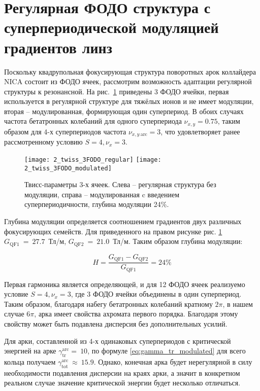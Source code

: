 	\section{Регулярная ФОДО структура с суперпериодической модуляцией градиентов линз}\label{sec:transition_variation/methods/FODO}

\par Поскольку квадрупольная фокусирующая структура поворотных арок коллайдера NICA состоит из ФОДО ячеек, рассмотрим возможность адаптации регулярной структуры к резонансной. На рис.~\ref{fig:twiss_3FODO} приведены 3 ФОДО ячейки, первая используется в регулярной структуре для тяжёлых ионов и не имеет модуляции, вторая – модулированная, формирующая один суперпериод. В обоих случаях частота бетатронных колебаний для одного суперпериода $\nu_{x,y}=0.75$, таким образом для 4-х суперпериодов частота $\nu_{x,y\ \text{arc}}=3$, что удовлетворяет ранее рассмотренному условию $S=4, \nu_x=3$.

\begin{figure}[h!]
	\texttt{[image: 2\_twiss\_3FODO\_regular]}
	\texttt{[image: 2\_twiss\_3FODO\_modulated]}
	\caption{Твисс-параметры 3-х ячеек. Слева – регулярная структура без модуляции, справа – модулированная c введением суперпериодичности, глубина модуляции 24\%.}
	\label{fig:twiss_3FODO}
\end{figure}

\noindent Глубина модуляции определяется соотношением градиентов двух различных фокусирующих семейств. Для приведенного на правом рисунке рис. \ref{fig:twiss_3FODO} $G_{\textrm{QF1}}~=~27.7$~Тл/м, $G_{\textrm{QF2}}~=~21.0$~Тл/м. Таким образом глубина модуляции:

\begin{equation}
H=\frac{G_{\textrm{QF1}}-G_{\textrm{QF2}}}{G_{\textrm{QF1}}}=24\%
\label {eq:modulated_coeff}
\end{equation}

\noindent Первая гармоника является определяющей, и для 12 ФОДО ячеек реализуемо условие $S=4, \nu_x=3$, где 3 ФОДО ячейки объединены в один суперпериод. Таким образом, благодаря набегу бетатронных колебаний кратному $2\pi$, в нашем случае $6\pi$, арка имеет свойства ахромата первого порядка. Благодаря этому свойству может быть подавлена дисперсия без дополнительных усилий.

\noindent Для арки, составленной из 4-х одинаковых суперпериодов с критической энергией на арке $\gamma_{\text{tr}}^{\text{arc}}=\ 10$, по формуле \ref{eq:gamma_tr_modulated} для всего кольца получаем $\gamma_{\text{tot}}^{\text{arc}}\ \approx\ 15.9$. Однако, конечная арка будет нерегулярной в силу необходимости подавления дисперсии на краях арки, а значит в конкретном реальном случае значение критической энергии будет несколько отличаться.

